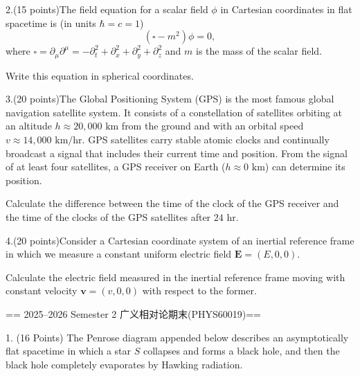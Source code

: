 2.(15 points)The field equation for a scalar field $\phi$ in Cartesian coordinates in flat spacetime is (in units $\hbar = c = 1$)
\[
(\square - m^{2})\phi = 0,
\]
where $\square = \partial_{\mu}\partial^{\mu} = -\partial_{t}^{2} + \partial_{x}^{2} + \partial_{y}^{2} + \partial_{z}^{2}$ and $m$ is the mass of the scalar field.

Write this equation in spherical coordinates.

3.(20 points)The Global Positioning System (GPS) is the most famous global navigation satellite system. It consists of a constellation of satellites orbiting at an altitude $h \approx 20,000 \text{ km}$ from the ground and with an orbital speed $v \approx 14,000 \text{ km/hr}$. GPS satellites carry stable atomic clocks and continually broadcast a signal that includes their current time and position. From the signal of at least four satellites, a GPS receiver on Earth ($h \approx 0 \text{ km}$) can determine its position.

Calculate the difference between the time of the clock of the GPS receiver and the time of the clocks of the GPS satellites after $24 \text{ hr}$.

4.(20 points)Consider a Cartesian coordinate system of an inertial reference frame in which we measure a constant uniform electric field $\mathbf{E} = (E,0,0)$.

Calculate the electric field measured in the inertial reference frame moving with constant velocity $\mathbf{v} = (v,0,0)$ with respect to the former.


== 2025--2026 Semester 2 广义相对论期末(PHYS60019)==


1. (16 Points) The Penrose diagram appended below describes an asymptotically flat spacetime in which a star $S$ collapses and forms a black hole, and then the black hole completely evaporates by Hawking radiation.

